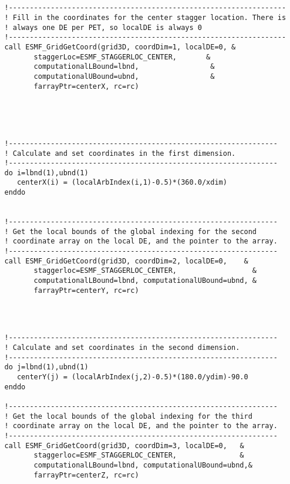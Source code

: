 
 \begin{verbatim}


   !------------------------------------------------------------------
   ! Fill in the coordinates for the center stagger location. There is
   ! always one DE per PET, so localDE is always 0
   !------------------------------------------------------------------
   call ESMF_GridGetCoord(grid3D, coordDim=1, localDE=0, &
          staggerLoc=ESMF_STAGGERLOC_CENTER,       &
          computationalLBound=lbnd,                 &
          computationalUBound=ubnd,                 &
          farrayPtr=centerX, rc=rc)
 
\end{verbatim}
 

 \begin{verbatim}



   !----------------------------------------------------------------
   ! Calculate and set coordinates in the first dimension.
   !----------------------------------------------------------------
   do i=lbnd(1),ubnd(1)
      centerX(i) = (localArbIndex(i,1)-0.5)*(360.0/xdim)
   enddo


   !----------------------------------------------------------------
   ! Get the local bounds of the global indexing for the second
   ! coordinate array on the local DE, and the pointer to the array.
   !----------------------------------------------------------------
   call ESMF_GridGetCoord(grid3D, coordDim=2, localDE=0,    &
          staggerloc=ESMF_STAGGERLOC_CENTER,                  &
          computationalLBound=lbnd, computationalUBound=ubnd, &
          farrayPtr=centerY, rc=rc)
 
\end{verbatim}
 

 \begin{verbatim}


   !----------------------------------------------------------------
   ! Calculate and set coordinates in the second dimension.
   !----------------------------------------------------------------
   do j=lbnd(1),ubnd(1)
      centerY(j) = (localArbIndex(j,2)-0.5)*(180.0/ydim)-90.0
   enddo

   !----------------------------------------------------------------
   ! Get the local bounds of the global indexing for the third
   ! coordinate array on the local DE, and the pointer to the array.
   !----------------------------------------------------------------
   call ESMF_GridGetCoord(grid3D, coordDim=3, localDE=0,   &
          staggerloc=ESMF_STAGGERLOC_CENTER,               &
          computationalLBound=lbnd, computationalUBound=ubnd,&
          farrayPtr=centerZ, rc=rc)
 
\end{verbatim}
 
